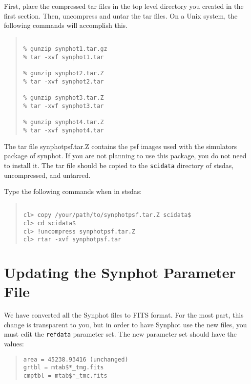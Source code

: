 \documentclass{article}
\begin{document}
First, place the compressed tar files in the top level directory you
created in the first section. Then, uncompress and untar the tar
files. On a Unix system, the following commands will accomplish this.

\begin{quote}\begin{verbatim}

% gunzip synphot1.tar.gz
% tar -xvf synphot1.tar

% gunzip synphot2.tar.Z 
% tar -xvf synphot2.tar

% gunzip synphot3.tar.Z 
% tar -xvf synphot3.tar

% gunzip synphot4.tar.Z 
% tar -xvf synphot4.tar

\end{verbatim}\end{quote}

The tar file synphotpsf.tar.Z contains the psf images used with the
simulators package of synphot. If you are not planning to use this
package, you do not need to install it. The tar file should be copied
to the {\tt scidata} directory of stsdas, uncompressed, and untarred.


Type the following commands when in stsdas:

\begin{quote}\begin{verbatim}

cl> copy /your/path/to/synphotpsf.tar.Z scidata$
cl> cd scidata$
cl> !uncompress synphotpsf.tar.Z
cl> rtar -xvf synphotpsf.tar

\end{verbatim}\end{quote}

\section{Updating the Synphot Parameter File}

We have converted all the Synphot files to FITS format. For the most
part, this change is transparent to you, but in order to have Synphot
use the new files, you must edit the {\tt refdata} parameter set. The
new parameter set should have the values:

\begin{quote}\begin{verbatim}
area = 45238.93416 (unchanged)
grtbl = mtab$*_tmg.fits
cmptbl = mtab$*_tmc.fits
\end{verbatim}\end{quote}
\end{document}
